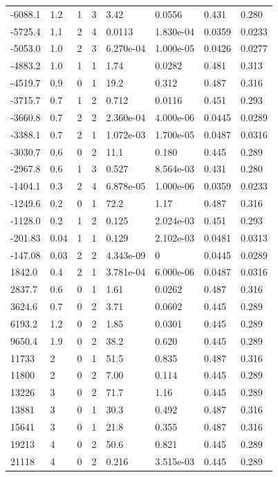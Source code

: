 \documentclass[preview]{standalone}
\begin{document}
{{\begin{tabular}{L{1.2cm}C{1.2cm} C{0.3cm}C{0.5cm} C{1.4cm}C{1.4cm} C{1.4cm}C{1.4cm}}
  -6088.1  &   1.2  & 1     &  3 &  3.42  & 0.0556  & 0.431 &  0.280   \\ 
  -5725.4  &   1.1  & 2     &  4 &  0.0113  & 1.830e-04  & 0.0359 &  0.0233   \\ 
  -5053.0  &   1.0  & 2     &  3 &  6.270e-04  & 1.000e-05  & 0.0426 &  0.0277   \\ 
  -4883.2  &   1.0  & 1     &  1 &  1.74  & 0.0282  & 0.481 &  0.313   \\ 
  -4519.7  &   0.9  & 0     &  1 &  19.2  & 0.312  & 0.487 &  0.316   \\ 
  -3715.7  &   0.7  & 1     &  2 &  0.712  & 0.0116  & 0.451 &  0.293   \\ 
  -3660.8  &   0.7  & 2     &  2 &  2.360e-04  & 4.000e-06  & 0.0445 &  0.0289   \\ 
  -3388.1  &   0.7  & 2     &  1 &  1.072e-03  & 1.700e-05  & 0.0487 &  0.0316   \\ 
  -3030.7  &   0.6  & 0     &  2 &  11.1  & 0.180  & 0.445 &  0.289   \\ 
  -2967.8  &   0.6  & 1     &  3 &  0.527  & 8.564e-03  & 0.431 &  0.280   \\ 
  -1404.1  &   0.3  & 2     &  4 &  6.878e-05  & 1.000e-06  & 0.0359 &  0.0233   \\ 
  -1249.6  &   0.2  & 0     &  1 &  72.2  & 1.17  & 0.487 &  0.316   \\ 
  -1128.0  &   0.2  & 1     &  2 &  0.125  & 2.024e-03  & 0.451 &  0.293   \\ 
  -201.83  &  0.04  & 1     &  1 &  0.129  & 2.102e-03  & 0.0481 &  0.0313   \\ 
  -147.08  &  0.03  & 2     &  2 &  4.343e-09  & 0  & 0.0445 &  0.0289   \\ 
  1842.0  &   0.4  & 2     &  1 &  3.781e-04  & 6.000e-06  & 0.0487 &  0.0316   \\ 
  2837.7  &   0.6  & 0     &  1 &  1.61  & 0.0262  & 0.487 &  0.316   \\ 
  3624.6  &   0.7  & 0     &  2 &  3.71  & 0.0602  & 0.445 &  0.289   \\ 
  6193.2  &   1.2  & 0     &  2 &  1.85  & 0.0301  & 0.445 &  0.289   \\ 
  9650.4  &   1.9  & 0     &  2 &  38.2  & 0.620  & 0.445 &  0.289   \\ 
  11733  &     2  & 0     &  1 &  51.5  & 0.835  & 0.487 &  0.316   \\ 
  11800  &     2  & 0     &  2 &  7.00  & 0.114  & 0.445 &  0.289   \\ 
  13226  &     3  & 0     &  2 &  71.7  & 1.16  & 0.445 &  0.289   \\ 
  13881  &     3  & 0     &  1 &  30.3  & 0.492  & 0.487 &  0.316   \\ 
  15641  &     3  & 0     &  1 &  21.8  & 0.355  & 0.487 &  0.316   \\ 
  19213  &     4  & 0     &  2 &  50.6  & 0.821  & 0.445 &  0.289   \\ 
  21118  &     4  & 0     &  2 &  0.216  & 3.515e-03  & 0.445 &  0.289   \\ 
\hline 
\end{tabular} 

}}
\end{document}

